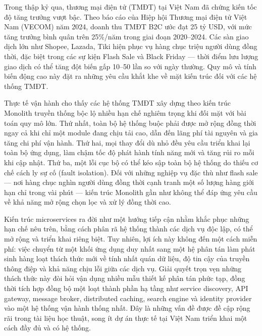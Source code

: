 \documentclass[../DoAn.tex]{subfiles}
\begin{document}
Trong thập kỷ qua, thương mại điện tử (TMĐT) tại Việt Nam đã chứng kiến tốc độ tăng trưởng
vượt bậc. Theo báo cáo của Hiệp hội Thương mại điện tử Việt Nam (VECOM) năm 2024, doanh thu
TMĐT B2C ước đạt 25 tỷ USD, với mức tăng trưởng bình quân trên 25\%/năm trong giai đoạn
2020--2024. Các sàn giao dịch lớn như Shopee, Lazada, Tiki hiện phục vụ hàng chục triệu
người dùng đồng thời, đặc biệt trong các sự kiện Flash Sale và Black Friday --- thời điểm
lưu lượng giao dịch có thể tăng đột biến gấp 10--50 lần so với ngày thường. Quy mô và tính
biến động cao này đặt ra những yêu cầu khắt khe về mặt kiến trúc đối với các hệ thống TMĐT.

Thực tế vận hành cho thấy các hệ thống TMĐT xây dựng theo kiến trúc Monolith truyền thống
bộc lộ nhiều hạn chế nghiêm trọng khi đối mặt với bài toán quy mô lớn. Thứ nhất, toàn bộ hệ
thống buộc phải được mở rộng đồng thời ngay cả khi chỉ một module đang chịu tải cao, dẫn đến
lãng phí tài nguyên và gia tăng chi phí vận hành. Thứ hai, mọi thay đổi dù nhỏ đều yêu cầu
triển khai lại toàn bộ ứng dụng, làm chậm tốc độ phát hành tính năng mới và tăng rủi ro mỗi
khi cập nhật. Thứ ba, một lỗi cục bộ có thể kéo sập toàn bộ hệ thống do thiếu cơ chế cách ly
sự cố (fault isolation). Đối với những nghiệp vụ đặc thù như flash sale --- nơi hàng chục
nghìn người dùng đồng thời cạnh tranh một số lượng hàng giới hạn chỉ trong vài phút ---
kiến trúc Monolith gần như không thể đáp ứng yêu cầu về khả năng mở rộng chọn lọc và xử lý
đồng thời cao.

Kiến trúc microservices ra đời như một hướng tiếp cận nhằm khắc phục những hạn chế nêu trên,
bằng cách phân rã hệ thống thành các dịch vụ độc lập, có thể mở rộng và triển khai riêng
biệt. Tuy nhiên, lợi ích này không đến một cách miễn phí: việc chuyển từ một khối ứng dụng
duy nhất sang một hệ phân tán làm phát sinh hàng loạt thách thức mới về tính nhất quán dữ
liệu, độ tin cậy của truyền thông điệp và khả năng chịu lỗi giữa các dịch vụ. Giải quyết
trọn vẹn những thách thức này đòi hỏi vận dụng nhiều mẫu thiết kế phân tán phức tạp, đồng
thời tích hợp đồng bộ một loạt thành phần hạ tầng như service discovery, API gateway,
message broker, distributed caching, search engine và identity provider vào một hệ thống
vận hành thống nhất. Đây là những vấn đề được đề cập rộng rãi trong tài liệu học thuật, song
ít dự án thực tế tại Việt Nam triển khai một cách đầy đủ và có hệ thống.
\end{document}
